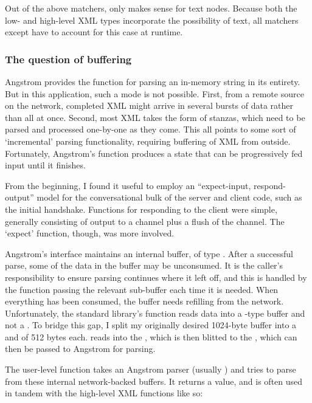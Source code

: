 Out of the above matchers, only  makes sense for text nodes. Because both the low- and high-level XML types incorporate the possibility of text, all matchers except  have to account for this case at runtime.

\subsubsection{The question of buffering}
Angstrom provides the  function for parsing an in-memory string in its entirety. But in this application, such a mode is not possible. First, from a remote source on the network, completed XML might arrive in several bursts of data rather than all at once. Second, most XML takes the form of stanzas, which need to be parsed and processed one-by-one as they come. This all points to some sort of `incremental' parsing functionality, requiring buffering of XML from outside. Fortunately, Angstrom's  function produces a state that can be progressively fed input until it finishes.

From the beginning, I found it useful to employ an ``expect-input, respond-output'' model for the conversational bulk of the server and client code, such as the initial handshake. Functions for responding to the client were simple, generally consisting of output to a channel plus a flush of the channel. The `expect' function, though, was more involved.

Angstrom's  interface maintains an internal buffer, of type . After a successful parse, some of the data in the buffer may be unconsumed. It is the caller's responsibility to ensure parsing continues where it left off, and this is handled by the function passing the relevant sub-buffer each time it is needed. When everything has been consumed, the buffer needs refilling from the network. Unfortunately, the standard library's  function reads data into a -type buffer and not a . To bridge this gap, I split my originally desired 1024-byte buffer into a  and  of 512 bytes each.  reads into the , which is then blitted to the , which can then be passed to Angstrom for parsing.

The user-level  function takes an Angstrom parser (usually ) and tries to parse from these internal network-backed buffers. It returns a  value, and is often used in tandem with the high-level XML functions like so:

